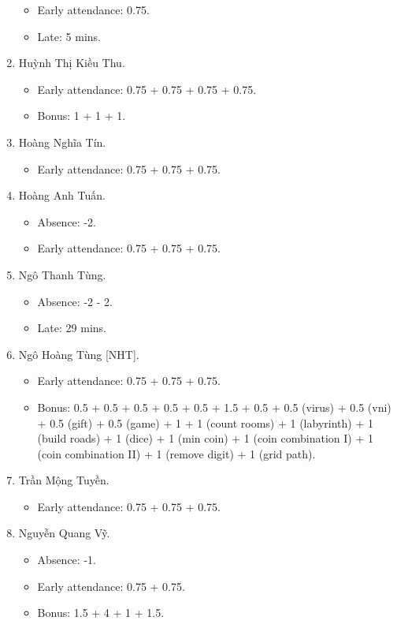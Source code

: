 \documentclass{article}
\begin{document}
\begin{enumerate}
\begin{itemize}
		\item Early attendance: 0.75.
		\item Late: 5 mins.
	\end{itemize}
	\item {\sc Huỳnh Thị Kiều Thu.}
	\begin{itemize}
		\item Early attendance: 0.75 + 0.75 + 0.75 + 0.75.
		\item Bonus: 1 + 1 + 1.
	\end{itemize}
	\item {\sc Hoàng Nghĩa Tín.}
	\begin{itemize}
		\item Early attendance: 0.75 + 0.75 + 0.75.
	\end{itemize}
	\item {\sc Hoàng Anh Tuấn.}
	\begin{itemize}
		\item Absence: -2.
		\item Early attendance: 0.75 + 0.75 + 0.75.
	\end{itemize}
	\item {\sc Ngô Thanh Tùng.}
	\begin{itemize}
		\item Absence: -2 - 2.
		\item Late: 29 mins.
	\end{itemize}
	\item {\sc Ngô Hoàng Tùng [NHT].}
	\begin{itemize}
		\item Early attendance: 0.75 + 0.75 + 0.75.
		\item Bonus: 0.5 + 0.5 + 0.5 + 0.5 + 0.5 + 1.5 + 0.5 + 0.5 (virus) + 0.5 (vni) + 0.5 (gift) + 0.5 (game) + 1 + 1 (count rooms) + 1 (labyrinth) + 1 (build roads) + 1 (dice) + 1 (min coin) + 1 (coin combination I) + 1 (coin combination II) + 1 (remove digit) + 1 (grid path).
	\end{itemize}
	\item {\sc Trần Mộng Tuyền.}
	\begin{itemize}
		\item Early attendance: 0.75 + 0.75 + 0.75.
	\end{itemize}
	\item {\sc Nguyễn Quang Vỹ.}
	\begin{itemize}
		\item Absence: -1.
		\item Early attendance: 0.75 + 0.75.
		\item Bonus: 1.5 + 4 + 1 + 1.5.
	\end{itemize}
\end{enumerate}
\end{document}
